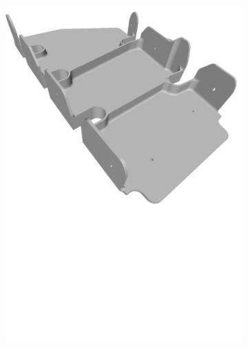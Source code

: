 \begin{figure}[h!]
{\begin{tcolorbox}
\begin{subfigure}[c]{.23\textwidth}
         \includegraphics[trim={0cm 9cm 0cm 0cm},clip,width=1\linewidth,angle=0]{Cap5/Figuras/objects/multi_side_bracket.pdf}
         \caption{}
         \label{fig:multi_side_bracket}
      \end{subfigure}
      \hfill
      \begin{subfigure}[c]{.23\textwidth}
         \centering

\end{subfigure}
\end{tcolorbox}}
\end{figure}
